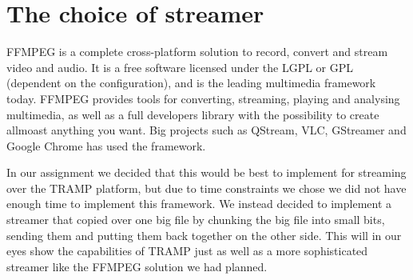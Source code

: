 
\section{The choice of streamer}
\label{sec:streamer}

FFMPEG is a complete cross-platform solution to record, convert and stream video and audio. It is a free software licensed under the LGPL or GPL (dependent on the configuration), and is the leading multimedia framework today.
FFMPEG provides tools for converting, streaming, playing and analysing multimedia, as well as a full developers library with the possibility to create allmoast anything you want. Big projects such as QStream, VLC, GStreamer and Google Chrome has used the framework.

In our assignment we decided that this would be best to implement for streaming over the TRAMP platform, but due to time constraints we chose we did not have enough time to implement this framework. We instead decided to implement a streamer that copied over one big file by chunking the big file into small bits, sending them and putting them back together on the other side. This will in our eyes show the capabilities of TRAMP just as well as a more sophisticated streamer like the FFMPEG solution we had planned.
